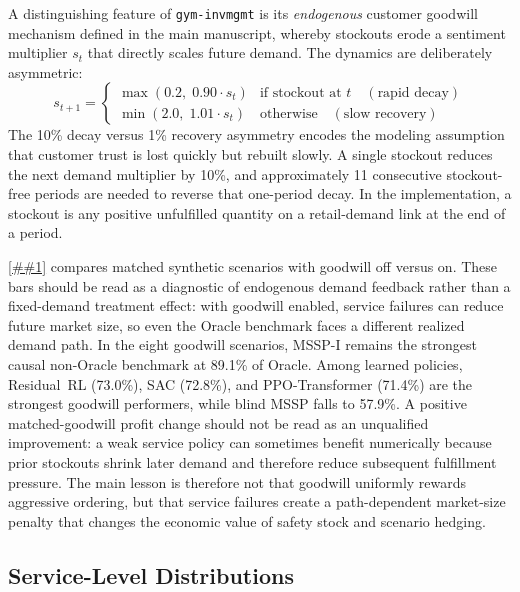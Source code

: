 \documentclass[10pt,a4paper]{article}
\providecommand{\Cref}[1]{\ref{##1}}
\begin{document}
A distinguishing feature of \texttt{gym-invmgmt} is its
\emph{endogenous} customer goodwill mechanism defined in the main manuscript,
whereby stockouts erode a sentiment multiplier $s_t$ that directly
scales future demand. The dynamics are deliberately asymmetric:
\begin{equation}
  s_{t+1} = \begin{cases}
    \max(0.2, \; 0.90 \cdot s_t) & \text{if stockout at } t \quad (\text{rapid decay}) \\
    \min(2.0, \; 1.01 \cdot s_t) & \text{otherwise} \quad (\text{slow recovery})
  \end{cases}
\end{equation}
The 10\% decay versus 1\% recovery asymmetry encodes the modeling
assumption that customer trust is lost quickly but rebuilt slowly.
A single stockout reduces the next demand multiplier by 10\%, and
approximately 11 consecutive stockout-free periods are needed to
reverse that one-period decay. In the implementation, a stockout is any
positive unfulfilled quantity on a retail-demand link at the end of a
period.

\Cref{fig:goodwill_impact} compares matched synthetic scenarios with
goodwill off versus on. These bars should be read as a diagnostic of
endogenous demand feedback rather than a fixed-demand treatment effect:
with goodwill enabled, service failures can reduce future market size,
so even the Oracle benchmark faces a different realized demand path.
In the eight goodwill scenarios, MSSP-I remains the strongest causal
non-Oracle benchmark at 89.1\% of Oracle. Among learned policies,
Residual~RL (73.0\%), SAC (72.8\%), and PPO-Transformer (71.4\%)
are the strongest goodwill performers, while blind MSSP falls to
57.9\%. A positive matched-goodwill profit change should not be read
as an unqualified improvement: a weak service policy can sometimes
benefit numerically because prior stockouts shrink later demand and
therefore reduce subsequent fulfillment pressure. The main lesson is
therefore not that goodwill uniformly rewards aggressive ordering, but
that service failures create a path-dependent market-size penalty that
changes the economic value of safety stock and scenario hedging.

\subsection{Service-Level Distributions}
\end{document}
